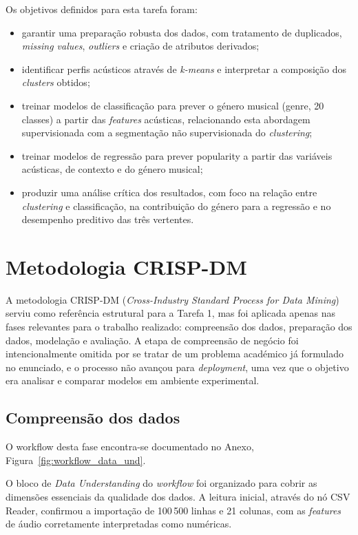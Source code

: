 \documentclass[11pt,a4paper]{article}
\newcommand{\code}[1]{{\ttfamily\hyphenchar\font=45\relax #1}}
\begin{document}
Os objetivos definidos para esta tarefa foram:
\begin{itemize}
    \item garantir uma preparação robusta dos dados, com tratamento de duplicados, \textit{missing values}, \textit{outliers} e criação de atributos derivados;
    \item identificar perfis acústicos através de \textit{k-means} e interpretar a composição dos \textit{clusters} obtidos;
    \item treinar modelos de classificação para prever o género musical (\code{genre}, 20 classes) a partir das \textit{features} acústicas, relacionando esta abordagem supervisionada com a segmentação não supervisionada do \textit{clustering};
    \item treinar modelos de regressão para prever \code{popularity} a partir das variáveis acústicas, de contexto e do género musical;
    \item produzir uma análise crítica dos resultados, com foco na relação entre \textit{clustering} e classificação, na contribuição do género para a regressão e no desempenho preditivo das três vertentes.
\end{itemize}

\section{Metodologia CRISP-DM}

A metodologia CRISP-DM (\textit{Cross-Industry Standard Process for Data Mining}) serviu como referência estrutural para a Tarefa 1, mas foi aplicada apenas nas fases relevantes para o trabalho realizado: compreensão dos dados, preparação dos dados, modelação e avaliação. A etapa de compreensão de negócio foi intencionalmente omitida por se tratar de um problema académico já formulado no enunciado, e o processo não avançou para \textit{deployment}, uma vez que o objetivo era analisar e comparar modelos em ambiente experimental.

\subsection{Compreensão dos dados}

O workflow desta fase encontra-se documentado no Anexo, Figura~\ref{fig:workflow_data_und}.

O bloco de \textit{Data Understanding} do \textit{workflow} foi organizado para cobrir as dimensões essenciais da qualidade dos dados. A leitura inicial, através do nó \code{CSV Reader}, confirmou a importação de 100\,500 linhas e 21 colunas, com as \textit{features} de áudio corretamente interpretadas como numéricas.
\end{document}
